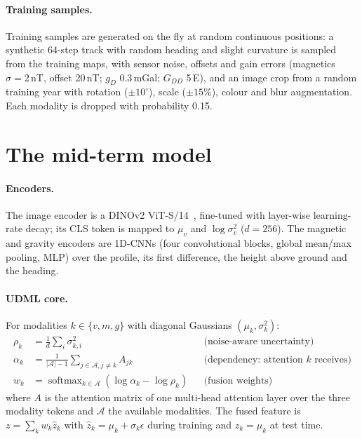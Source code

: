 \documentclass[11pt,a4paper]{article}
\begin{document}
\paragraph{Training samples.} Training samples are generated on the fly at random continuous positions:
a synthetic 64-step track with random heading and slight curvature is sampled from the training maps,
with sensor noise, offsets and gain errors (magnetics $\sigma=2$\,nT, offset 20\,nT; $g_D$ 0.3\,mGal;
$G_{DD}$ 5\,E), and an image crop from a random training year with rotation ($\pm10^\circ$), scale
($\pm15\%$), colour and blur augmentation. Each modality is dropped with probability 0.15.

\section{The mid-term model}\label{sec:model}
\paragraph{Encoders.} The image encoder is a DINOv2 ViT-S/14~\cite{dosovitskiy2021vit,oquab2023dinov2},
fine-tuned with layer-wise learning-rate decay; its CLS token is mapped to $\mu_v$ and $\log\sigma^2_v$
($d=256$). The magnetic and gravity encoders are 1D-CNNs (four convolutional blocks, global mean/max
pooling, MLP) over the profile, its first difference, the height above ground and the heading.

\paragraph{UDML core.} For modalities $k\in\{v,m,g\}$ with diagonal Gaussians $(\mu_k,\sigma_k^2)$:
\begin{align}
\rho_k &= \tfrac{1}{d}\textstyle\sum_i \sigma_{k,i}^2 &&\text{(noise-aware uncertainty)}\\
\alpha_k &= \tfrac{1}{|\mathcal{A}|-1}\textstyle\sum_{j\in\mathcal{A}, j\neq k} A_{jk} &&\text{(dependency: attention $k$ receives)}\\
w_k &= \operatorname{softmax}_{k\in\mathcal{A}}\left(\log\alpha_k - \log\rho_k\right) &&\text{(fusion weights)}
\end{align}
where $A$ is the attention matrix of one multi-head attention layer over the three modality tokens and
$\mathcal{A}$ the available modalities. The fused feature is $z=\sum_k w_k \hat z_k$ with
$\hat z_k=\mu_k+\sigma_k\epsilon$ during training and $\hat z_k=\mu_k$ at test time.
\end{document}
